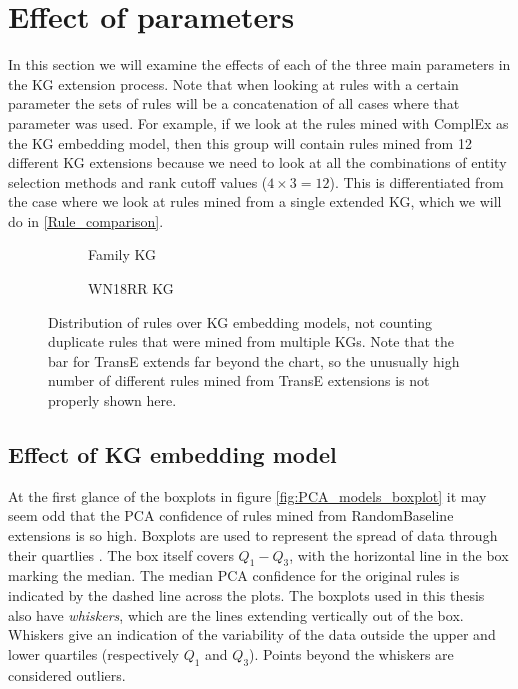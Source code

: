 \section{Effect of parameters}
In this section we will examine the effects of each of the three main parameters in the KG extension process. Note that when looking at rules with a certain parameter the sets of rules will be a concatenation of all cases where that parameter was used. For example, if we look at the rules mined with ComplEx as the KG embedding model, then this group will contain rules mined from 12 different KG extensions because we need to look at all the combinations of entity selection methods and rank cutoff values ($4\times3=12$). This is differentiated from the case where we look at rules mined from a single extended KG, which we will do in \cref{Rule_comparison}.
\begin{figure}[htbp]
\centering
\begin{subfigure}{1\textwidth}
  \centering
  
  \caption{Family KG}
  \label{rule_dist_models_hbar_family}
\end{subfigure}%
\hfill
\begin{subfigure}{1\textwidth}
  \centering
  
  \caption{WN18RR KG}
  \label{rule_dist_models_hbar_wn18rr}
\end{subfigure}
\caption[Rules and their types over KG embedding models]{Distribution of rules over KG embedding models, not counting duplicate rules that were mined from multiple KGs. Note that the bar for TransE extends far beyond the chart, so the unusually high number of different rules mined from TransE extensions is not properly shown here.}
\label{rule_dist_models_hbar}
\end{figure}

\subsection{Effect of KG embedding model}
At the first glance of the boxplots in figure \ref{fig:PCA_models_boxplot} it may seem odd that the PCA confidence of rules mined from RandomBaseline extensions is so high. Boxplots are used to represent the spread of data through their quartlies \cite{dutoit2012graphical}. The box itself covers $Q_1-Q_3$, with the horizontal line in the box marking the median. The median PCA confidence for the original rules is indicated by the dashed line across the plots. The boxplots used in this thesis also have \textit{whiskers}, which are the lines extending vertically out of the box. Whiskers give an indication of the variability of the data outside the upper and lower quartiles (respectively $Q_1$ and $Q_3$). Points beyond the whiskers are considered outliers.

